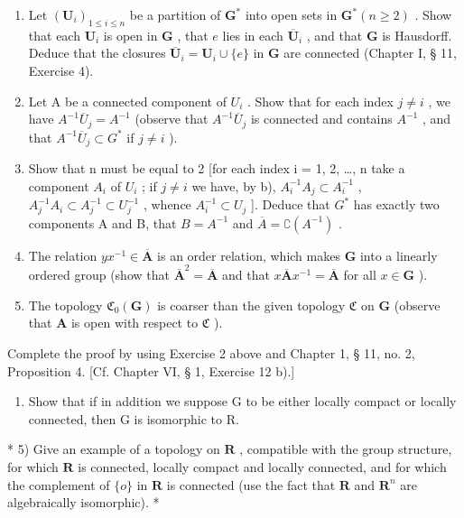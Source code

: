 \begin{enumerate}
\def\labelenumi{\alph{enumi})}
\item
  Let \((\mathbf{U}_i)_{1 \leqslant i \leqslant n}\) be a partition of \(\mathbf{G}^*\) into open sets in \(\mathbf{G}^* (n \geqslant 2)\) . Show that each \(\mathbf{U}_i\) is open in \(\mathbf{G}\) , that \(e\) lies in each \(\overline{\mathbf{U}}_i\) , and that \(\mathbf{G}\) is Hausdorff. Deduce that the closures \(\overline{\mathbf{U}}_i = \mathbf{U}_i \cup \{e\}\) in \(\mathbf{G}\) are connected (Chapter I, § 11, Exercise 4).
\item
  Let A be a connected component of \(U_{i}\) . Show that for each index \(j \neq i\) , we have \(A^{-1}\overline{U}_{j} = A^{-1}\) (observe that \(A^{-1}\overline{U}_{j}\) is connected and contains \(A^{-1}\) , and that \(A^{-1}\overline{U}_{j} \subset G^{*}\) if \(j \neq i\) ).
\item
  Show that n must be equal to 2 {[}for each index i = 1, 2, \ldots, n take a component \(A_{i}\) of \(U_{i}\) ; if \(j \neq i\) we have, by b), \(A_{i}^{-1}A_{j} \subset A_{i}^{-1}\) , \(A_{j}^{-1}A_{i} \subset A_{j}^{-1} \subset U_{j}^{-1}\) , whence \(A_{i}^{-1} \subset U_{j}\) {]}. Deduce that \(G^{*}\) has exactly two components A and B, that \(B = A^{-1}\) and \(\overline{A} = \complement(A^{-1})\) .
\item
  The relation \(yx^{-1} \in \overline{\mathbf{A}}\) is an order relation, which makes \(\mathbf{G}\) into a linearly ordered group (show that \(\overline{\mathbf{A}}^2 = \overline{\mathbf{A}}\) and that \(x\overline{\mathbf{A}}x^{-1} = \overline{\mathbf{A}}\) for all \(x \in \mathbf{G}\) ).
\item
  The topology \(\mathfrak{C}_0(\mathbf{G})\) is coarser than the given topology \(\mathfrak{C}\) on \(\mathbf{G}\) (observe that \(\mathbf{A}\) is open with respect to \(\mathfrak{C}\) ).
\end{enumerate}

Complete the proof by using Exercise 2 above and Chapter 1, § 11, no. 2, Proposition 4. {[}Cf. Chapter VI, § 1, Exercise 12 b).{]}

\begin{enumerate}
\def\labelenumi{\alph{enumi})}
\setcounter{enumi}{5}
\tightlist
\item
  Show that if in addition we suppose G to be either locally compact or locally connected, then G is isomorphic to R.
\end{enumerate}

* 5) Give an example of a topology on \(\mathbf{R}\) , compatible with the group structure, for which \(\mathbf{R}\) is connected, locally compact and locally connected, and for which the complement of \(\{o\}\) in \(\mathbf{R}\) is connected (use the fact that \(\mathbf{R}\) and \(\mathbf{R}^n\) are algebraically isomorphic). *

